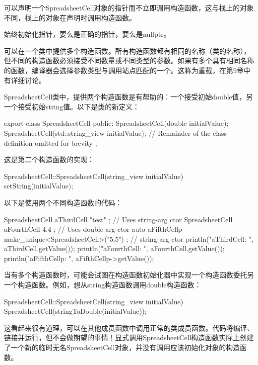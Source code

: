 可以声明一个SpreadsheetCell对象的指针而不立即调用构造函数，这与栈上的对象不同，栈上的对象在声明时调用构造函数。

始终初始化指针，要么是正确的指针，要么是nullptr。


可以在一个类中提供多个构造函数。所有构造函数都有相同的名称（类的名称），但不同的构造函数必须接受不同数量或不同类型的参数。如果有多个具有相同名称的函数，编译器会选择参数类型与调用站点匹配的一个。这称为重载，在第9章中有详细讨论。

SpreadsheetCell类中，提供两个构造函数是有帮助的：一个接受初始double值，另一个接受初始string值。以下是类的新定义：

\begin{cpp}
export class SpreadsheetCell
{
    public:
        SpreadsheetCell(double initialValue);
        SpreadsheetCell(std::string_view initialValue);
        // Remainder of the class definition omitted for brevity
};
\end{cpp}

这是第二个构造函数的实现：

\begin{cpp}
SpreadsheetCell::SpreadsheetCell(string_view initialValue)
{
    setString(initialValue);
}
\end{cpp}

以下是使用两个不同构造函数的代码：

\begin{cpp}
SpreadsheetCell aThirdCell { "test" }; // Uses string-arg ctor
SpreadsheetCell aFourthCell { 4.4 }; // Uses double-arg ctor
auto aFifthCellp { make_unique<SpreadsheetCell>("5.5") }; // string-arg ctor
println("aThirdCell: {}", aThirdCell.getValue());
println("aFourthCell: {}", aFourthCell.getValue());
println("aFifthCellp: {}", aFifthCellp->getValue());
\end{cpp}

当有多个构造函数时，可能会试图在构造函数初始化器中实现一个构造函数委托另一个构造函数。例如，想从string构造函数调用double构造函数：

\begin{cpp}
SpreadsheetCell::SpreadsheetCell(string_view initialValue)
{
    SpreadsheetCell(stringToDouble(initialValue));
}
\end{cpp}

这看起来很有道理，可以在其他成员函数中调用正常的类成员函数。代码将编译、链接并运行，但不会做期望的事情！显式调用SpreadsheetCell构造函数实际上创建了一个新的临时无名SpreadsheetCell对象，并没有调用应该初始化对象的构造函数。

